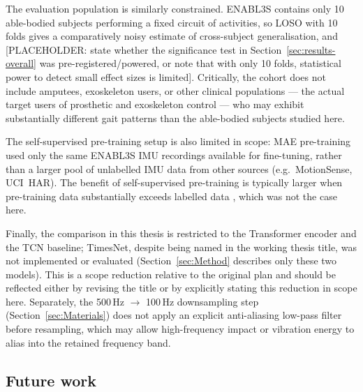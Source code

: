 The evaluation population is similarly constrained. ENABL3S contains only
\num{10} able-bodied subjects performing a fixed circuit of activities, so
LOSO with \num{10} folds gives a comparatively noisy estimate of cross-subject
generalisation, and [PLACEHOLDER: state whether the significance test in
Section~\ref{sec:results-overall} was pre-registered/powered, or note that
with only \num{10} folds, statistical power to detect small effect sizes is
limited]. Critically, the cohort does not include amputees, exoskeleton users,
or other clinical populations — the actual target users of prosthetic and
exoskeleton control — who may exhibit substantially different gait patterns
than the able-bodied subjects studied here.

The self-supervised pre-training setup is also limited in scope: MAE
pre-training used only the same ENABL3S IMU recordings available for
fine-tuning, rather than a larger pool of unlabelled IMU data from other
sources (e.g.\ MotionSense, UCI~HAR). The benefit of self-supervised
pre-training is typically larger when pre-training data substantially exceeds
labelled data \cite{PLACEHOLDER}, which was not the case here.

Finally, the comparison in this thesis is restricted to the Transformer
encoder and the TCN baseline; TimesNet, despite being named in the working
thesis title, was not implemented or evaluated
(Section~\ref{sec:Method} describes only these two models). This is a scope
reduction relative to the original plan and should be reflected either by
revising the title or by explicitly stating this reduction in scope here.
Separately, the 500\,Hz $\to$ 100\,Hz downsampling step
(Section~\ref{sec:Materials}) does not apply an explicit anti-aliasing
low-pass filter before resampling, which may allow high-frequency impact or
vibration energy to alias into the retained frequency band.

\subsection{Future work}\label{sec:conclusion-future-work}

